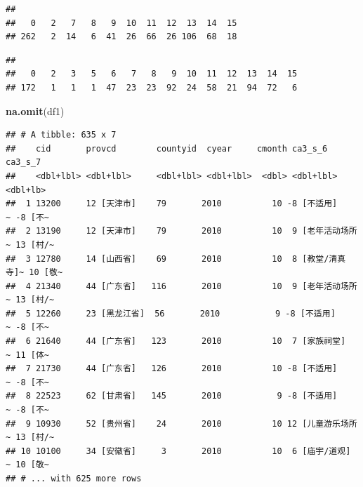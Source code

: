 \documentclass[
]{book}
\newenvironment{Shaded}{\begin{snugshade}}{\end{snugshade}}
\newcommand{\DecValTok}[1]{\textcolor[rgb]{0.00,0.00,0.81}{#1}}
\newcommand{\FunctionTok}[1]{\textcolor[rgb]{0.13,0.29,0.53}{\textbf{#1}}}
\newcommand{\NormalTok}[1]{#1}
\newcommand{\OtherTok}[1]{\textcolor[rgb]{0.56,0.35,0.01}{#1}}
\newcommand{\SpecialCharTok}[1]{\textcolor[rgb]{0.81,0.36,0.00}{\textbf{#1}}}
\begin{document}
\begin{Shaded}
\end{Shaded}

\begin{verbatim}
## 
##   0   2   7   8   9  10  11  12  13  14  15 
## 262   2  14   6  41  26  66  26 106  68  18
\end{verbatim}

\begin{Shaded}
\end{Shaded}

\begin{verbatim}
## 
##   0   2   3   5   6   7   8   9  10  11  12  13  14  15 
## 172   1   1   1  47  23  23  92  24  58  21  94  72   6
\end{verbatim}

\begin{Shaded}
\begin{Highlighting}[]
\FunctionTok{na.omit}\NormalTok{(df1)}
\end{Highlighting}
\end{Shaded}

\begin{verbatim}
## # A tibble: 635 x 7
##    cid       provcd        countyid  cyear     cmonth ca3_s_6           ca3_s_7 
##    <dbl+lbl> <dbl+lbl>     <dbl+lbl> <dbl+lbl>  <dbl> <dbl+lbl>         <dbl+lb>
##  1 13200     12 [天津市]    79       2010          10 -8 [不适用]     ~ -8 [不~
##  2 13190     12 [天津市]    79       2010          10  9 [老年活动场所~ 13 [村/~
##  3 12780     14 [山西省]    69       2010          10  8 [教堂/清真寺]~ 10 [敬~
##  4 21340     44 [广东省]   116       2010          10  9 [老年活动场所~ 13 [村/~
##  5 12260     23 [黑龙江省]  56       2010           9 -8 [不适用]     ~ -8 [不~
##  6 21640     44 [广东省]   123       2010          10  7 [家族祠堂]   ~ 11 [体~
##  7 21730     44 [广东省]   126       2010          10 -8 [不适用]     ~ -8 [不~
##  8 22523     62 [甘肃省]   145       2010           9 -8 [不适用]     ~ -8 [不~
##  9 10930     52 [贵州省]    24       2010          10 12 [儿童游乐场所~ 13 [村/~
## 10 10100     34 [安徽省]     3       2010          10  6 [庙宇/道观]  ~ 10 [敬~
## # ... with 625 more rows
\end{verbatim}
\end{document}

